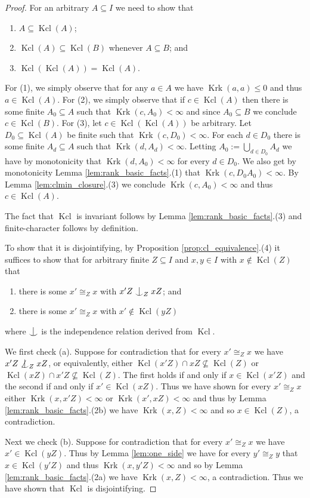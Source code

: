 \documentclass[12pt]{amsart}
\theoremstyle{plain}
\theoremstyle{definition}
\newcommand{\isom}{\cong}
\DeclareMathOperator{\clmin}{Kcl}
\DeclareMathOperator{\Krk}{Krk}
\newcommand{\forkindep}[1][]{%
  \mathrel{
    \mathop{
      \vcenter{
        \hbox{\oalign{\noalign{\kern-.3ex}\hfil$\vert$\hfil\cr
              \noalign{\kern-.7ex}
              $\smile$\cr\noalign{\kern-.3ex}}}
      }
    }\displaylimits_{#1}
  }
}
\begin{document}
\begin{proof}
For an arbitrary $A \subseteq I$ we need to show that 
\begin{enumerate}
\item $A \subseteq \clmin(A)$;
\item $\clmin(A) \subseteq \clmin(B)$ whenever $A \subseteq B$; and
\item $\clmin(\clmin(A)) = \clmin(A)$.
\end{enumerate}

For (1), we simply observe that for any $a \in A$ we have $\Krk(a, a) \le 0$ and thus $a \in \clmin(A)$.
For (2), we simply observe that if $c \in \clmin(A)$ then there is some finite $A_0 \subseteq A$ such that $\Krk(c, A_0) < \infty$ and since $A_0 \subseteq B$ we conclude $c \in \clmin(B)$.
For (3), let $c \in \clmin(\clmin(A))$ be arbitrary.
Let $D_0 \subseteq \clmin(A)$ be finite such that $\Krk(c, D_0) < \infty$.
For each $d \in D_0$ there is some finite $A_d \subseteq A$ such that $\Krk(d, A_d) < \infty$.
Letting $A_0 := \bigcup_{d \in D_0} A_d$ we have by monotonicity that $\Krk(d, A_0) < \infty$ for every $d \in D_0$.
We also get by monotonicity Lemma \ref{lem:rank_basic_facts}.(1) that $\Krk(c, D_0A_0) < \infty$.
By Lemma \ref{lem:clmin_closure}.(3) we conclude $\Krk(c, A_0) < \infty$ and thus $c \in \clmin(A)$.

The fact that $\clmin$ is invariant follows by Lemma \ref{lem:rank_basic_facts}.(3) and finite-character follows by definition.

To show that it is disjointifying, by Proposition \ref{prop:cl_equivalence}.(4) it suffices to show that for arbitrary finite $Z \subseteq I$ and $x, y \in I$ with $x \not\in \clmin(Z)$ that 
\begin{enumerate}
\item[(a)] there is some $x' \isom_Z x$ with $x'Z \forkindep[Z] xZ$; and
\item[(b)] there is some $x' \isom_Z x$ with $x' \not\in \clmin(yZ)$
\end{enumerate}
where $\forkindep$ is the independence relation derived from $\clmin$.

We first check (a).
Suppose for contradiction that for every $x' \isom_Z x$ we have $x'Z \not\forkindep[Z] xZ$, or equivalently, either $\clmin(x'Z) \cap xZ \not\subseteq \clmin(Z)$ or $\clmin(xZ) \cap x'Z \not\subseteq \clmin(Z)$.
The first holds if and only if $x \in \clmin(x'Z)$ and the second if and only if $x' \in \clmin(xZ)$.
Thus we have shown for every $x' \isom_Z x$ either $\Krk(x, x'Z) < \infty$ or $\Krk(x', xZ) < \infty$ and thus by Lemma \ref{lem:rank_basic_facts}.(2b) we have $\Krk(x, Z) < \infty$ and so $x \in \clmin(Z)$, a contradiction.

Next we check (b).
Suppose for contradiction that for every $x' \isom_Z x$ we have $x' \in \clmin(yZ)$.
Thus by Lemma \ref{lem:one_side} we have for every $y' \isom_Z y$ that $x \in \clmin(y'Z)$ and thus $\Krk(x, y'Z) < \infty$ and so by Lemma \ref{lem:rank_basic_facts}.(2a) we have $\Krk(x, Z) < \infty$, a contradiction.
Thus we have shown that $\clmin$ is disjointifying.

\end{proof}
\end{document}
